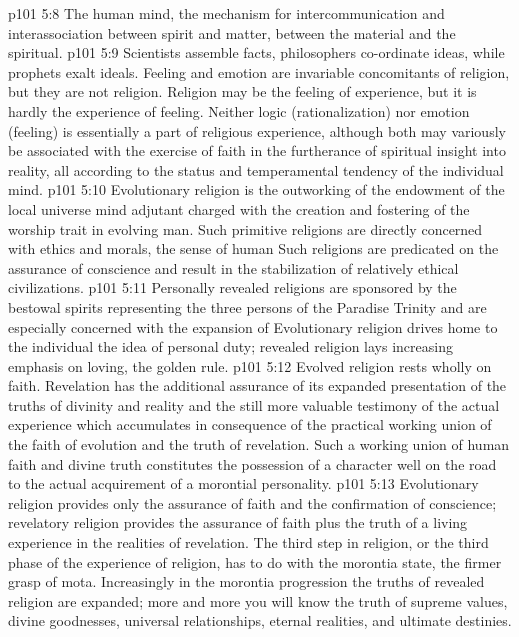 \vs p101 5:8 \bibnobreakspace The human mind, the mechanism for intercommunication and interassociation between spirit and matter, between the material and the spiritual.
\vs p101 5:9 \pc Scientists assemble facts, philosophers co\hyp{}ordinate ideas, while prophets exalt ideals. Feeling and emotion are invariable concomitants of religion, but they are not religion. Religion may be the feeling of experience, but it is hardly the experience of feeling. Neither logic (rationalization) nor emotion (feeling) is essentially a part of religious experience, although both may variously be associated with the exercise of faith in the furtherance of spiritual insight into reality, all according to the status and temperamental tendency of the individual mind.
\vs p101 5:10 Evolutionary religion is the outworking of the endowment of the local universe mind adjutant charged with the creation and fostering of the worship trait in evolving man. Such primitive religions are directly concerned with ethics and morals, the sense of human  Such religions are predicated on the assurance of conscience and result in the stabilization of relatively ethical civilizations.
\vs p101 5:11 Personally revealed religions are sponsored by the bestowal spirits representing the three persons of the Paradise Trinity and are especially concerned with the expansion of  Evolutionary religion drives home to the individual the idea of personal duty; revealed religion lays increasing emphasis on loving, the golden rule.
\vs p101 5:12 Evolved religion rests wholly on faith. Revelation has the additional assurance of its expanded presentation of the truths of divinity and reality and the still more valuable testimony of the actual experience which accumulates in consequence of the practical working union of the faith of evolution and the truth of revelation. Such a working union of human faith and divine truth constitutes the possession of a character well on the road to the actual acquirement of a morontial personality.
\vs p101 5:13 \pc Evolutionary religion provides only the assurance of faith and the confirmation of conscience; revelatory religion provides the assurance of faith plus the truth of a living experience in the realities of revelation. The third step in religion, or the third phase of the experience of religion, has to do with the morontia state, the firmer grasp of mota. Increasingly in the morontia progression the truths of revealed religion are expanded; more and more you will know the truth of supreme values, divine goodnesses, universal relationships, eternal realities, and ultimate destinies.
